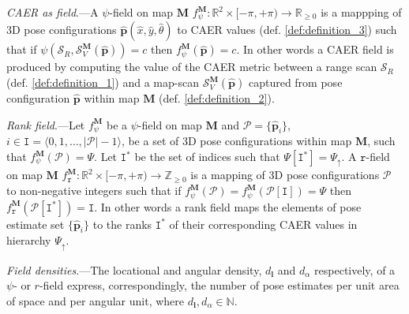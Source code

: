 \begin{definition}
  \label{def:definition_4} \textit{CAER as field}.---A $\psi$-field on map
  $\bm{M}$
  $f_{\psi}^{\bm{M}} : \mathbb{R}^2 \times [-\pi, +\pi) \rightarrow \mathbb{R}_{\geq 0}$
  is a mappping of 3D pose configurations
  $\hat{\bm{p}}(\hat{x},\hat{y},\hat{\theta})$ to CAER values (def.
  \ref{def:definition_3}) such that if
  $\psi(\mathcal{S}_R,\mathcal{S}_V^{\bm{M}}(\hat{\bm{p}})) = c$ then
  $f_{\psi}^{\bm{M}}(\hat{\bm{p}}) = c$. In other words a CAER field is
  produced by computing the value of the CAER metric between a range scan
  $\mathcal{S}_R$ (def. \ref{def:definition_1}) and a map-scan
  $\mathcal{S}_V^{\bm{M}}(\hat{\bm{p}})$ captured from pose configuration
  $\hat{\bm{p}}$ within map $\bm{M}$ (def. \ref{def:definition_2}).
\end{definition}

\begin{definition}
  \label{def:definition_5} \textit{Rank field}.---Let $f_{\psi}^{\bm{M}}$ be
  a $\psi$-field on map $\bm{M}$ and $\mathcal{P} = \{\hat{\bm{p}}_i\}$,
  $i \in \texttt{I} = \langle 0,1,\dots,|\mathcal{P}|-1 \rangle$, be a set of 3D pose
  configurations within map $\bm{M}$, such that
  $f_{\psi}^{\bm{M}}(\mathcal{P}) = \Psi$. Let $\texttt{I}^{\ast}$
  be the set of indices such that $\Psi[\texttt{I}^{\ast}] = \Psi_\uparrow$.
  A $\texttt{r}$-field on map $\bm{M}$
  $f_{\texttt{r}}^{\bm{M}} : \mathbb{R}^2 \times [-\pi, +\pi) \rightarrow \mathbb{Z}_{\geq 0}$
  is a mapping of 3D pose configurations $\mathcal{P}$ to non-negative integers
  such that if $f_{\psi}^{\bm{M}}(\mathcal{P}) = f_{\psi}^{\bm{M}}(\mathcal{P}[\texttt{I}]) = \Psi$ then
  $f_{\texttt{r}}^{\bm{M}}(\mathcal{P}[\texttt{I}^\ast]) = \texttt{I}$.
  In other words a rank field maps the elements of pose estimate set $\{\hat{\bm{p}}_i\}$
  to the ranks $\texttt{I}^\ast$ of their corresponding CAER values in
  hierarchy $\Psi_\uparrow$.
\end{definition}

\begin{definition}
  \label{def:definition_6} \textit{Field densities}.---The locational and
  angular density, $d_{\bm{l}}$ and $d_{\alpha}$ respectively, of a
  $\psi$- or $r$-field express, correspondingly, the number of pose estimates
  per unit area of space and per angular unit, where
  $d_{\bm{l}}, d_{\alpha} \in \mathbb{N}$.
\end{definition}


